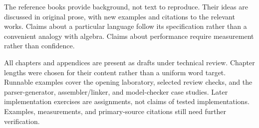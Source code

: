 The reference books provide background, not text to reproduce.
Their ideas are discussed in original prose, with new examples and citations to the relevant works.
Claims about a particular language follow its specification rather than a convenient analogy with algebra.
Claims about performance require measurement rather than confidence.

\begin{ccnote}
All chapters and appendices are present as drafts under technical review.
Chapter lengths were chosen for their content rather than a uniform word target.
Runnable examples cover the opening laboratory, selected review checks, and the parser-generator, assembler/linker, and model-checker case studies.
Later implementation exercises are assignments, not claims of tested implementations.
Examples, measurements, and primary-source citations still need further verification.
\end{ccnote}
